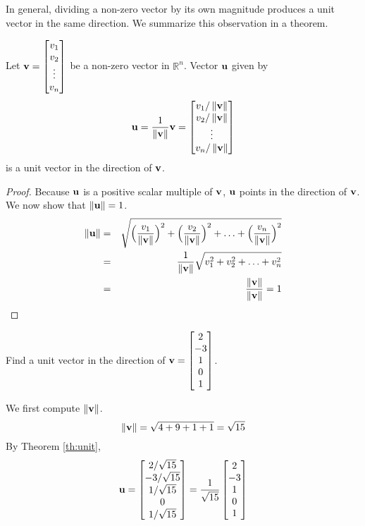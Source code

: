 \documentclass{ximera}
\begin{document}
In general, dividing a non-zero vector by its own magnitude produces a unit vector in the same direction.  We summarize this observation in a theorem.


  \begin{theorem}\label{th:unit} Let ${\bf v}=\begin{bmatrix}v_1\\v_2\\\vdots\\v_n\end{bmatrix}$ be a non-zero vector in $\mathbb{R}^n$. Vector ${\bf u}$ given by
  \begin{equation*}
 {\bf u}=\frac{1}{\left\lVert{\bf v}\right\rVert}{\bf v}=\begin{bmatrix}v_1/\left\lVert{\bf v}\right\rVert\\v_2/\left\lVert{\bf v}\right\rVert\\\vdots\\v_n/\left\lVert{\bf v}\right\rVert\end{bmatrix}
\end{equation*}
is a unit vector in the direction of ${\bf v}$.
\end{theorem}

\begin{proof}
Because ${\bf u}$ is a positive scalar multiple of ${\bf v}$, ${\bf u}$ points in the direction of ${\bf v}$.  We now show that $\left\lVert{\bf u}\right\rVert=1$.
\begin{eqnarray*}
\left\lVert{\bf u}\right\rVert&=&\sqrt{ \Big(\frac{v_1}{\left\lVert{\bf v}\right\rVert}\Big)^2+\Big(\frac{v_2}{\left\lVert{\bf v}\right\rVert}\Big)^2+\ldots +\Big(\frac{v_n}{\left\lVert{\bf v}\right\rVert}\Big)^2}\\
&=&\frac{1}{\left\lVert{\bf v}\right\rVert}\sqrt{v_1^2+v_2^2+\ldots +v_n^2}\\
&=&\frac{\left\lVert{\bf v}\right\rVert}{\left\lVert{\bf v}\right\rVert}=1
\end{eqnarray*}
\end{proof}


\begin{example}\label{reference}
Find a unit vector in the direction of ${\bf v}=\begin{bmatrix}2\\-3\\1\\0\\1\end{bmatrix}$.

\begin{explanation}
We first compute $\left\lVert{\bf v}\right\rVert$.
$$\left\lVert{\bf v}\right\rVert=\sqrt{4+9+1+1}=\sqrt{15}$$
By Theorem \ref{th:unit}, 
$${\bf u}=\begin{bmatrix}2/\sqrt{15}\\-3/\sqrt{15}\\1/\sqrt{15}\\0\\1/\sqrt{15}\end{bmatrix}=\frac{1}{\sqrt{15}}\begin{bmatrix}2\\-3\\1\\0\\1\end{bmatrix}$$
\end{explanation}
\end{example}
\end{document}
